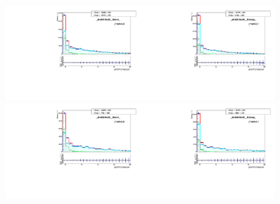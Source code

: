 \begin{figure}[htb]
  \begin{center}
   \includegraphics[width=0.45\textwidth]{../figs/figs_v11/MUON_WGamma/MCclosureWjetsPlusWg/c_TEMPL_CHISO_UNblind__phoEt15to20__Barrel__RooFit_MCclosure.pdf}\includegraphics[width=0.45\textwidth]{../figs/figs_v11/MUON_WGamma/MCclosureWjetsPlusWg/c_TEMPL_CHISO_UNblind__phoEt15to20__Endcap__RooFit_MCclosure.pdf}\\
   \includegraphics[width=0.45\textwidth]{../figs/figs_v11/MUON_WGamma/MCclosureWjetsPlusWg/c_TEMPL_CHISO_UNblind__phoEt20to25__Barrel__RooFit_MCclosure.pdf}\includegraphics[width=0.45\textwidth]{../figs/figs_v11/MUON_WGamma/MCclosureWjetsPlusWg/c_TEMPL_CHISO_UNblind__phoEt20to25__Endcap__RooFit_MCclosure.pdf}\\

\end{center}
\end{figure}
